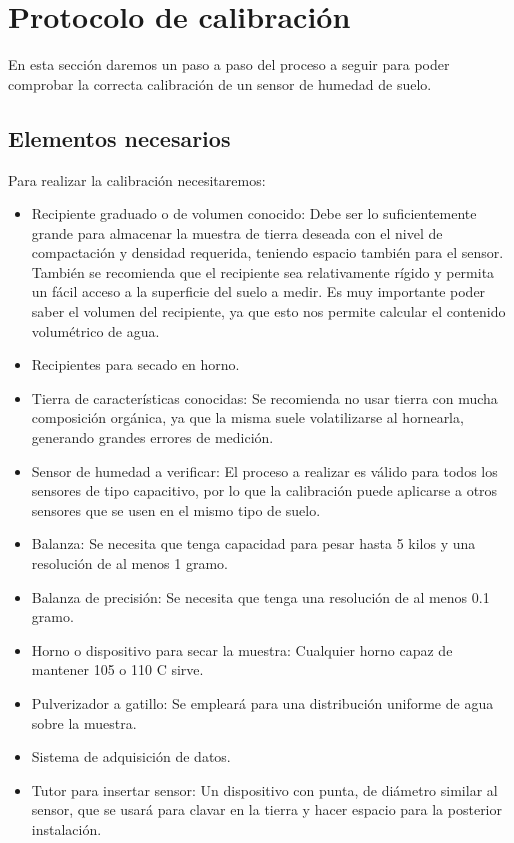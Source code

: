 \section{Protocolo de calibración}

En esta sección daremos un paso a paso del proceso a seguir para poder comprobar la correcta calibración de un sensor de humedad de suelo.

\subsection{Elementos necesarios}

Para realizar la calibración necesitaremos:
\begin{itemize}
    \item Recipiente graduado o de volumen conocido: Debe ser lo suficientemente grande para almacenar la muestra de tierra deseada con el nivel de compactación y densidad requerida, teniendo espacio también para el sensor.
    También se recomienda que el recipiente sea relativamente rígido y permita un fácil acceso a la superficie del suelo a medir.
    Es muy importante poder saber el volumen del recipiente, ya que esto nos permite calcular el contenido volumétrico de agua.
    \item Recipientes para secado en horno.
    \item Tierra de características conocidas: Se recomienda no usar tierra con mucha composición orgánica, ya que la misma suele volatilizarse al hornearla, generando grandes errores de medición.
    \item Sensor de humedad a verificar: El proceso a realizar es válido para todos los sensores de tipo capacitivo, por lo que la calibración puede aplicarse a otros sensores que se usen en el mismo tipo de suelo.
    \item Balanza: Se necesita que tenga capacidad para pesar hasta 5 kilos y una resolución de al menos 1 gramo.
    \item Balanza de precisión: Se necesita que tenga  una resolución de al menos 0.1 gramo.
    \item Horno o dispositivo para secar la muestra: Cualquier horno capaz de mantener 105 o 110 \degree C sirve.
    \item Pulverizador a gatillo: Se empleará para una distribución uniforme de agua sobre la muestra.
    \item Sistema de adquisición de datos.
    \item Tutor para insertar sensor: Un dispositivo con punta, de diámetro similar al sensor, que se usará para clavar en la tierra y hacer espacio para la posterior instalación.
\end{itemize}

